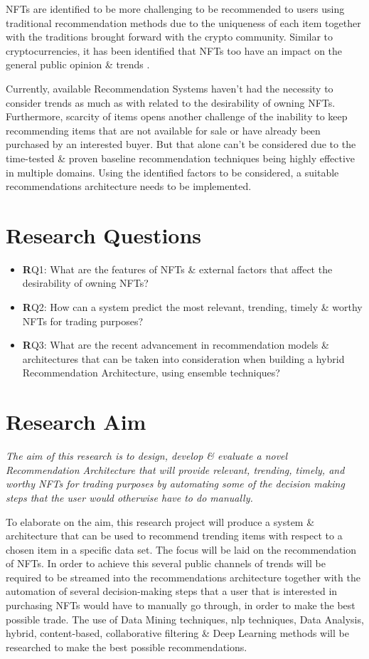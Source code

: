 \documentclass[a4paper, 12pt, oneside]{report}
\begin{document}
NFTs are identified to be more challenging to be recommended to users using traditional recommendation methods due to the uniqueness of each item together with the traditions brought forward with the crypto community.
Similar to cryptocurrencies, it has been identified that NFTs too have an impact on the general public opinion \& trends \autocite{dowling_fertile_2021}.

Currently, available Recommendation Systems haven't had the necessity to consider trends as much as with related to the desirability of owning NFTs. Furthermore, scarcity of items opens another challenge of the inability to keep recommending items that are not available for sale or have already been purchased by an interested buyer. But that alone can't be considered due to the time-tested \& proven baseline recommendation techniques being highly effective in multiple domains. Using the identified factors to be considered, a suitable recommendations architecture needs to be implemented.

\chapter{Research Questions}

\begin{itemize}[label={}]
  \item {\textbf RQ1:} What are the features of NFTs \& external factors that affect the desirability of owning NFTs?
  \item {\textbf RQ2:} How can a system predict the most relevant, trending, timely \& worthy NFTs for trading purposes?
  \item {\textbf RQ3:} What are the recent advancement in recommendation models \& architectures that can be taken into consideration when building a hybrid Recommendation Architecture, using ensemble techniques? 
\end{itemize}

\chapter{Research Aim}
\textit{The aim of this research is to design, develop \& evaluate a novel Recommendation Architecture that will provide relevant, trending, timely, and worthy NFTs for trading purposes by automating some of the decision making steps that the user would otherwise have to do manually.}

\bigbreak
To elaborate on the aim, this research project will produce a system \& architecture that can be used to recommend trending items with respect to a chosen item in a specific data set. The focus will be laid on the recommendation of NFTs. In order to achieve this several public channels of trends will be required to be streamed into the recommendations architecture together with the automation of several decision-making steps that a user that is interested in purchasing NFTs would have to manually go through, in order to make the best possible trade. The use of Data Mining techniques, \Gls{nlp} techniques, Data Analysis, hybrid, content-based, collaborative filtering \& Deep Learning methods will be researched to make the best possible recommendations.
\end{document}
